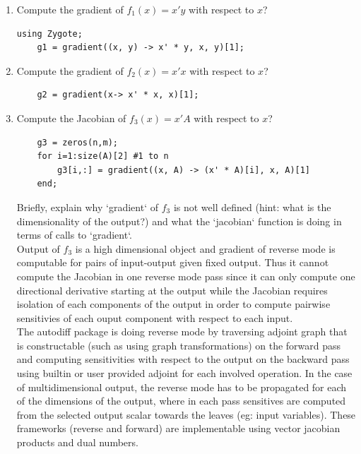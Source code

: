 \documentclass[12pt,letter]{article}
\begin{document}
\begin{enumerate}
  \item Compute the gradient of $f_1(x) = x'y$ with respect to $x$?

\begin{verbatim}
using Zygote;
    g1 = gradient((x, y) -> x' * y, x, y)[1];
\end{verbatim}

  \item Compute the gradient of $f_2(x) = x'x$ with respect to $x$?
\begin{verbatim}
    g2 = gradient(x-> x' * x, x)[1];
\end{verbatim}

  \item Compute the Jacobian of $f_3(x) = x'A$ with respect to $x$?
\begin{verbatim}
    g3 = zeros(n,m);
    for i=1:size(A)[2] #1 to n
        g3[i,:] = gradient((x, A) -> (x' * A)[i], x, A)[1]
    end;
\end{verbatim}

    \pagebreak
    
    Briefly, explain why `gradient` of $f_3$ is not well defined (hint: what is the dimensionality of the output?) and what the `jacobian` function is doing in terms of calls to `gradient`.\\

    Output of $f_3$ is a high dimensional object and gradient of reverse mode is computable for pairs of input-output given fixed output. Thus it cannot compute the Jacobian in one reverse mode pass since it can only compute one directional derivative starting at the output while the Jacobian requires isolation of each components of the output in order to compute pairwise sensitivies of each ouput component with respect to each input.\\
    
    The autodiff package is doing reverse mode by traversing adjoint graph that is constructable (such as using graph transformations) on the forward pass and computing sensitivities with respect to the output on the backward pass using builtin or user provided adjoint for each involved operation. In the case of multidimensional output, the reverse mode has to be propagated for each of the dimensions of the output, where in each pass sensitives are computed from the selected output scalar towards the leaves (eg: input variables). These frameworks (reverse and forward) are implementable using vector jacobian products and dual numbers.\\
    

\end{enumerate}
\end{document}
